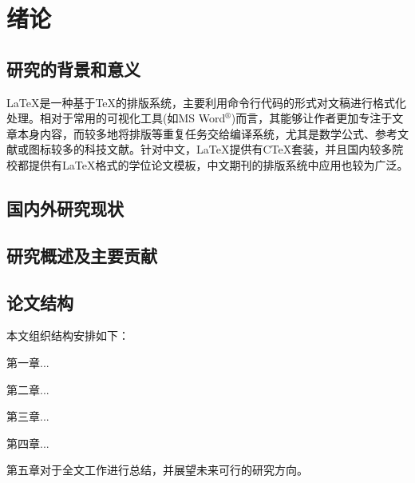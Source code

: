 \chapter{绪论}\label{chap:Introduction}
\section{研究的背景和意义}\label{sec:Background}
\LaTeX{}是一种基于\TeX{}的排版系统，主要利用命令行代码的形式对文稿进行格式化处理。相对于常用的可视化工具(如MS Word$^{\circledR}$)而言，其能够让作者更加专注于文章本身内容，而较多地将排版等重复任务交给编译系统，尤其是数学公式、参考文献或图标较多的科技文献。针对中文，\LaTeX{}提供有CTeX套装，并且国内较多院校都提供有\LaTeX{}格式的学位论文模板，中文期刊的排版系统中应用也较为广泛。

\section{国内外研究现状}\label{sec:ResStatus}

\section{研究概述及主要贡献}\label{sec:MainContribution}

\section{论文结构}\label{sec:PaperStructure}
本文组织结构安排如下：

第一章...

第二章...

第三章...

第四章...

第五章对于全文工作进行总结，并展望未来可行的研究方向。


